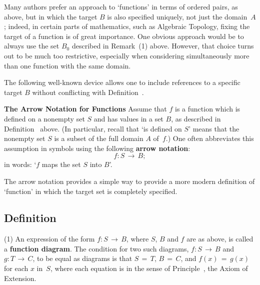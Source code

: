 \VV

        Many authors prefer an approach to `functions' in terms of ordered pairs, as above, but in which the target $B$ is also specified uniquely,
    not just the domain~$A$; indeed, in certain parts of mathematics, such as Algebraic Topology, fixing the target of a function is of great importance.
    One obvious approach would be to always use the set $B_{0}$ described in Remark~(1) above.  
    However, that choice turns out to be much too restrictive, especially when considering simultaneously more than one function with the same domain.

        The following well-known device allows one to include references to a specific target $B$ without conflicting with Definition~.

\VV

        {\bf The Arrow Notation for Functions}
    Assume that $f$ is a function which is defined on a nonempty set $S$ and has values in a set $B$, as described in Definition~ above.
    (In particular, recall that `is defined on $S$' means that the nonempty set $S$ is a subset of the full domain $A$ of~$f$.)
    One often abbreviates this assumption in symbols using the following {\bf arrow notation}:
        \begin{displaymath}
        f:S \,{\rightarrow}\, B;
        \end{displaymath}
    in words: `$f$ maps the set $S$ into $B$'.

\VV

        The arrow notation provides a simple way to provide a more modern definition of `function' in which the target set is completely specified.

\V

            \subsection{\small{\bf Definition}}
            \label{DefA30.20A}

\V

         (1) An expression of the form $f:S \,{\rightarrow}\, B$,
    where $S$, $B$ and $f$ are as above, is called a {\bf function diagram}. 
    The condition for two such diagrams, $f:S \,{\rightarrow}\, B$ and $g:T \,{\rightarrow}\, C$, to be equal as diagrams
    is that $S \,=\, T$, $B \,=\, C$, and $f(x) \,=\, g(x)$ for each $x$ in~$S$, where each equation is in the sense of Principle~, the Axiom of Extension.

